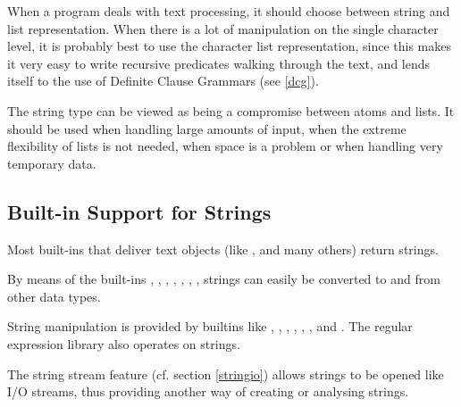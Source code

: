 When a program deals with text processing, it should choose between string
and list representation.
When there is a lot of
manipulation on the single character level, it is probably best to use
the character list representation, since this
makes it very easy to write recursive predicates walking through the text,
and lends itself to the use of Definite Clause Grammars (see \ref{dcg}).

The string type can be viewed as being a compromise between atoms and lists.
It should be used when handling large amounts of input, when the extreme
flexibility of lists is not needed, when space is a problem or when
handling very temporary data.


\subsection{Built-in Support for Strings}
Most {\eclipse} built-ins that deliver text objects (like
,
 and many
others) return strings.

By means of the built-ins
,
,
,
,
,
,
,
strings can easily be converted to and from other data types.

String manipulation is provided by builtins like
,
,
,
,
,
, and
.
The regular expression library
also operates on strings.

The string stream feature (cf. section \ref{stringio}) allows strings to
be opened like I/O streams, thus providing another way of creating or
analysing strings.


